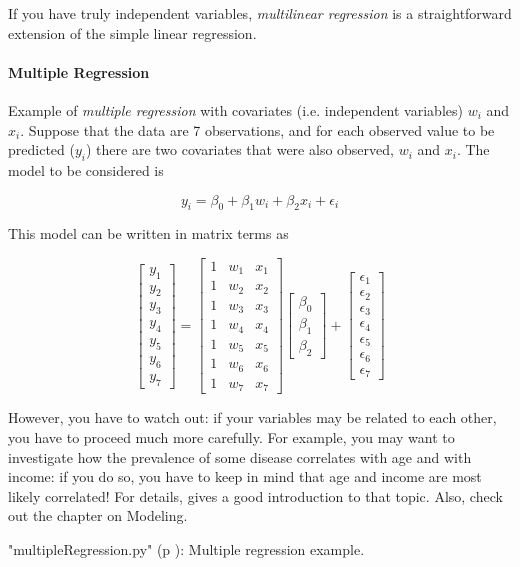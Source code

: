If you have truly independent variables, \emph{multilinear regression} is a straightforward extension of the simple linear regression.

\paragraph{Multiple Regression} 
Example of \emph{multiple regression} with covariates (i.e. independent variables) $w_i$ and $x_i$.
Suppose that the data are 7 observations, and for each observed value to be predicted ($y_i$) there are two covariates that were also observed, $w_i$ and $x_i$. The model to be considered is

\begin{equation}
  y_i = \beta_0 + \beta_1 w_i + \beta_2 x_i + \epsilon_i
\end{equation}

This model can be written in matrix terms as

\begin{equation}\label{eq:multipleRegression}
  \begin{bmatrix}y_1 \\ y_2 \\ y_3 \\ y_4 \\ y_5 \\ y_6 \\ y_7 \end{bmatrix} =
    \begin{bmatrix} 1 & w_1 & x_1  \\1 & w_2 & x_2  \\1 & w_3 & x_3  \\1 & w_4 & x_4  \\1 & w_5 & x_5  \\1 & w_6 & x_6 \\ 1& w_7  & x_7  \end{bmatrix}
    \begin{bmatrix} \beta_0 \\ \beta_1 \\ \beta_2  \end{bmatrix}
    +
    \begin{bmatrix} \epsilon_1 \\ \epsilon_2 \\ \epsilon_3 \\ \epsilon_4 \\ \epsilon_5 \\ \epsilon_6 \\ \epsilon_7 \end{bmatrix}
\end{equation}


However, you have to watch out: if your variables may be related to each other, you have to proceed much more carefully. For example, you may want to investigate how the prevalence of some disease correlates with age and with income: if you do so, you have to keep in mind that age and income are most likely correlated! For details, \cite{Kaplan2009} gives a good introduction to that topic. Also, check out the chapter on Modeling.

\PyImg "multipleRegression.py" (p \pageref{py:multipleRegression}): Multiple regression example.
